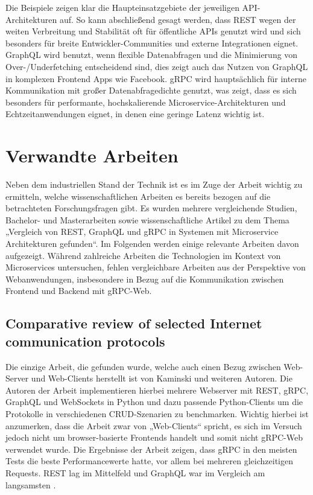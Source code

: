 Die Beispiele zeigen klar die Haupteinsatzgebiete der jeweiligen API-Architekturen auf. 
So kann abschließend gesagt werden, dass REST wegen der weiten Verbreitung und Stabilität oft für öffentliche APIs genutzt wird und sich besonders für breite Entwickler-Communities und externe Integrationen eignet.
GraphQL wird benutzt, wenn flexible Datenabfragen und die Minimierung von Over-/Underfetching entscheidend sind, dies zeigt auch das Nutzen von GraphQL in komplexen Frontend Apps wie Facebook.
gRPC wird hauptsächlich für interne Kommunikation mit großer Datenabfragedichte genutzt, was zeigt, dass es sich besonders für performante, hochskalierende Microservice-Architekturen und Echtzeitanwendungen eignet, in denen eine geringe Latenz wichtig ist.

\section{Verwandte Arbeiten}
Neben dem industriellen Stand der Technik ist es im Zuge der Arbeit wichtig zu ermitteln, welche wissenschaftlichen Arbeiten es bereits bezogen auf die betrachteten Forschungsfragen gibt. Es wurden mehrere vergleichende Studien, Bachelor- und Masterarbeiten sowie wissenschaftliche Artikel zu dem Thema „Vergleich von REST, GraphQL und gRPC in Systemen mit Microservice Architekturen gefunden“. Im Folgenden werden einige relevante Arbeiten davon aufgezeigt. Während zahlreiche Arbeiten die Technologien im Kontext von Microservices untersuchen, fehlen vergleichbare Arbeiten aus der Perspektive von Webanwendungen, insbesondere in Bezug auf die Kommunikation zwischen Frontend und Backend mit gRPC-Web.

\subsection{Comparative review of selected Internet communication protocols}
Die einzige Arbeit, die gefunden wurde, welche auch einen Bezug zwischen Web-Server und Web-Clients herstellt ist von Kaminski und weiteren Autoren. Die Autoren der Arbeit implementieren hierbei mehrere Webserver mit REST, gRPC, GraphQL und WebSockets in Python und dazu passende Python-Clients um die Protokolle in verschiedenen CRUD-Szenarien zu benchmarken. Wichtig hierbei ist anzumerken, dass die Arbeit zwar von „Web-Clients“ spricht, es sich  im Versuch jedoch nicht um browser-basierte Frontends handelt und somit nicht gRPC-Web verwendet wurde. Die Ergebnisse der Arbeit zeigen, dass gRPC in den meisten Tests die beste Performancewerte hatte, vor allem bei mehreren gleichzeitigen Requests. REST lag im Mittelfeld und GraphQL war im Vergleich am langsamsten  \parencite{Kaminski2022Comparative}. 

